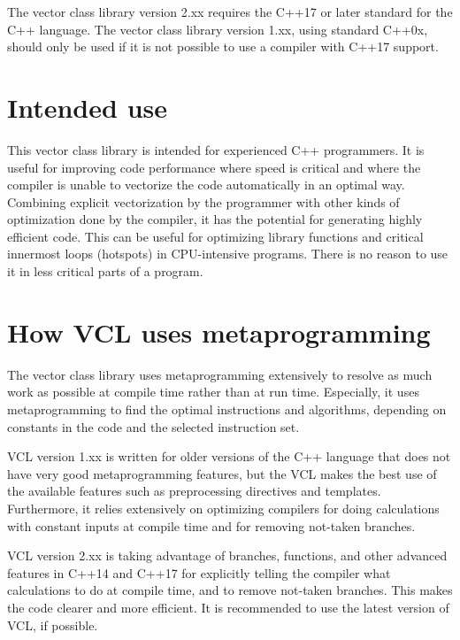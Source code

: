 \documentclass[vcl_manual.tex]{subfiles}
\begin{document}
The vector class library version 2.xx requires the C++17 or later standard for the C++ language. The vector class library version 1.xx, using standard C++0x, should only be used if it is not possible to use a compiler with C++17 support.

\section{Intended use} \label{IntendedUse}
This vector class library is intended for experienced C++ programmers. It is useful for improving code performance where speed is critical and where the compiler is unable to vectorize the code automatically in an optimal way. Combining explicit vectorization by the programmer with other kinds of optimization done by the compiler, it has the potential for generating highly efficient code. This can be useful for optimizing library functions and critical innermost loops (hotspots) in CPU-intensive programs. There is no reason to use it in less critical parts of a program.

\section{How VCL uses metaprogramming} \label{HowVCLUsesMetaprogramming}
The vector class library uses metaprogramming extensively to resolve as much work as possible at compile time rather than at run time. Especially, it uses metaprogramming to find the optimal instructions and algorithms, depending on constants in the code and the selected instruction set.

VCL version 1.xx is written for older versions of the C++ language that does not have very good metaprogramming features, but the VCL makes the best use of the available features such as preprocessing directives and templates. Furthermore, it relies extensively on optimizing compilers for  doing calculations with constant inputs at compile time and for removing not-taken branches.

VCL version 2.xx is taking advantage of  branches,  functions, and other advanced features in 
C++14 and C++17 for explicitly telling the compiler what calculations to do at compile time, and to remove not-taken branches. This makes the code clearer and more efficient. It is recommended to use the latest version of VCL, if possible.
\end{document}
